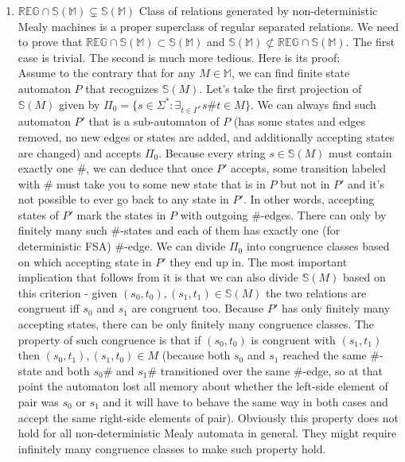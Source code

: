 \documentclass[12pt]{article}
\begin{document}
\begin{enumerate}
\item $\mathbb{REG} \cap \mathbb{S}(\mathbb{M}) \subsetneq \mathbb{S}(\mathbb{M})$ Class of relations generated by non-deterministic Mealy machines is a proper superclass of regular separated relations. We need to prove that $\mathbb{REG} \cap \mathbb{S}(\mathbb{M}) \subset \mathbb{S}(\mathbb{M})$ and $\mathbb{S}(\mathbb{M}) \not\subset \mathbb{REG} \cap \mathbb{S}(\mathbb{M})$. The first case is trivial. The second is much more tedious. Here is its proof: \\
Assume to the contrary that for any $M \in \mathbb{M}$, we can find finite state automaton $P$ that recognizes  $\mathbb{S}(M)$. Let's take the first projection of $\mathbb{S}(M)$ given by 
$\Pi_0 = \{s \in \Sigma^* : \exists_{t\in\Gamma^*} s\#t \in M\}$. We can always find such automaton $P'$ that is a sub-automaton of $P$ (has some states and edges removed, no new edges or states are added, and additionally accepting states are changed) and accepts $\Pi_0$. Because every string $s \in  \mathbb{S}(M)$ must contain exactly one $\#$, we can deduce that once $P'$ accepts, some transition labeled with $\#$ must take you to some new state that is in $P$ but not in $P'$ and it's not possible to ever go back to any state in $P'$. In other words, accepting states of $P'$ mark the states in $P$ with outgoing $\#$-edges. There can only by finitely many such $\#$-states and each of them has exactly one (for deterministic FSA) $\#$-edge. We can divide $\Pi_0$ into congruence classes based on which accepting state in $P'$ they end up in. The most important implication that follows from it is that we can also divide $ \mathbb{S}(M)$ based on this criterion - given $(s_0,t_0),(s_1,t_1) \in \mathbb{S}(M)$ the two relations are congruent iff $s_0$ and $s_1$ are congruent too. Because $P'$ has only finitely many accepting states, there can be only finitely many congruence classes. The property of such congruence is that if $(s_0,t_0)$ is congruent with $(s_1,t_1)$ then $(s_0,t_1),(s_1,t_0)\in M$ (because both $s_0$ and $s_1$ reached the same $\#$-state and both $s_0\#$ and $s_1\#$ transitioned over the same $\#$-edge, so at that point the automaton lost all memory about whether the left-side element of pair was $s_0$ or $s_1$ and it will have to behave the same way in both cases and accept the same right-side elements of pair). Obviously this property does not hold for all non-deterministic Mealy automata in general. They might require infinitely many congruence classes to make such property hold.


\end{enumerate}
\end{document}
